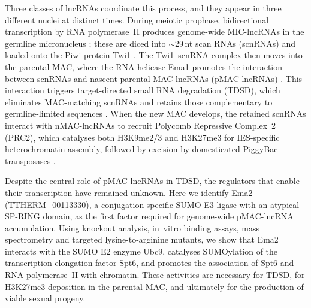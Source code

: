 Three classes of lncRNAs coordinate this process, and they appear in three
different nuclei at distinct times. During meiotic prophase, bidirectional
transcription by RNA polymerase~II produces genome-wide MIC-lncRNAs in the
germline micronucleus \citep{mochizuki2004rpb3,chalker2001nongenic}; these
are diced into $\sim$29\,nt scan RNAs (scnRNAs) and loaded onto the Piwi
protein Twi1 \citep{mochizuki2002twi1,noto2010giw1}. The Twi1--scnRNA complex
then moves into the parental MAC, where the RNA helicase Ema1 promotes the
interaction between scnRNAs and nascent parental MAC lncRNAs (pMAC-lncRNAs)
\citep{aronica2008ema1}. This interaction triggers target-directed small RNA
degradation (TDSD), which eliminates MAC-matching scnRNAs and retains those
complementary to germline-limited sequences \citep{schoeberl2012biased}.
When the new MAC develops, the retained scnRNAs interact with nMAC-lncRNAs to
recruit Polycomb Repressive Complex~2 (PRC2), which catalyses both
H3K9me2/3 and H3K27me3 \citep{liu2004h3k9,liu2007rnai,frapporti2019ezl1} for
IES-specific heterochromatin assembly, followed by excision by domesticated
PiggyBac transposases \citep{cheng2010transposase,dubois2017piggymac}.

Despite the central role of pMAC-lncRNAs in TDSD, the regulators that enable
their transcription have remained unknown. Here we identify Ema2
(TTHERM\_00113330), a conjugation-specific SUMO E3 ligase with an atypical
SP-RING domain, as the first factor required for genome-wide pMAC-lncRNA
accumulation. Using knockout analysis, in~vitro binding assays, mass
spectrometry and targeted lysine-to-arginine mutants, we show that Ema2
interacts with the SUMO E2 enzyme Ubc9, catalyses SUMOylation of the
transcription elongation factor Spt6, and promotes the association of Spt6
and RNA polymerase~II with chromatin. These activities are necessary for
TDSD, for H3K27me3 deposition in the parental MAC, and ultimately for the
production of viable sexual progeny.

